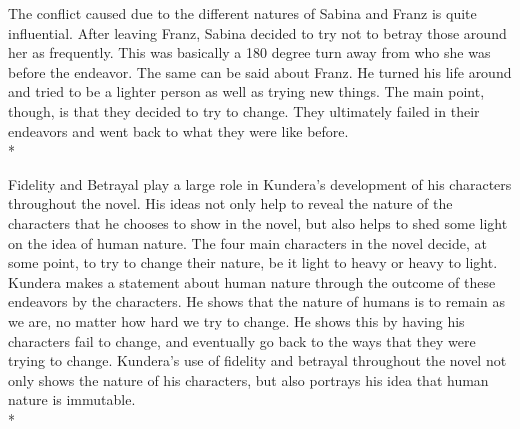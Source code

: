 \documentclass[12pt, letterpaper]{report}
\begin{document}
    The conflict caused due to the different natures of Sabina and Franz is quite influential. After leaving Franz, Sabina decided to try not to betray those around her as frequently. This was basically a 180 degree turn away from who she was before the endeavor. The same can be said about Franz. He turned his life around and tried to be a lighter person as well as trying new things. The main point, though, is that they decided to try to change. They ultimately failed in their endeavors and went back to what they were like before.\\*
    
    Fidelity and Betrayal play a large role in Kundera’s development of his characters throughout the novel. His ideas not only help to reveal the nature of the characters that he chooses to show in the novel, but also helps to shed some light on the idea of human nature. The four main characters in the novel decide, at some point, to try to change their nature, be it light to heavy or heavy to light. Kundera makes a statement about human nature through the outcome of these endeavors by the characters. He shows that the nature of humans is to remain as we are, no matter how hard we try to change. He shows this by having his characters fail to change, and eventually go back to the ways that they were trying to change. Kundera’s use of fidelity and betrayal throughout the novel not only shows the nature of his characters, but also portrays his idea that human nature is immutable.\\*

    \printindex
\end{document}
